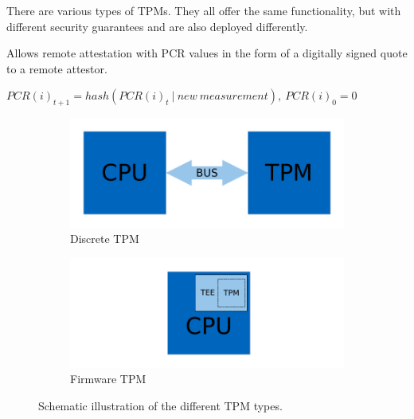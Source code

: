There are various types of TPMs. They all offer the same functionality, but with different security guarantees and are also deployed differently.

Allows remote attestation with PCR values in the form of a digitally signed quote to a remote attestor.


$PCR(i)_{t+1} = hash(PCR(i)_t\ |\ new\ measurement),\ PCR(i)_0 = 0$


\begin{figure}
    \begin{subfigure}{0.49\textwidth}
      \includegraphics[width=\linewidth]{figures/dTPM.pdf}
      \caption{Discrete TPM} \label{fig:dtpm}
    \end{subfigure}%
    \hspace*{\fill}   %
    \begin{subfigure}{0.49\textwidth}
      \includegraphics[width=\linewidth]{figures/fTPM.pdf}
      \caption{Firmware TPM} \label{fig:ftpm}
    \end{subfigure}%
  
  \caption{Schematic illustration of the different TPM types.} \label{fig:tpm_types}
  \end{figure}

